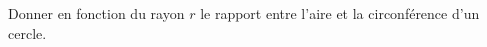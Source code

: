 
\begin{exercice}\label{exoSeconde-0061}

    Donner en fonction du rayon \( r\) le rapport entre l'aire et la circonférence d'un cercle.

\end{exercice}
